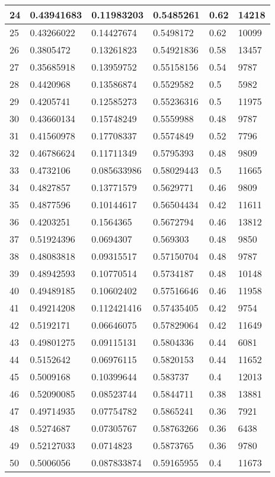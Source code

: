 \begin{longtable}{|l|l|l|l|l|l|}
24 & 0.43941683 & 0.11983203 & 0.5485261 & 0.62 & 14218 \\ \hline 
25 & 0.43266022 & 0.14427674 & 0.5498172 & 0.62 & 10099 \\ \hline 
26 & 0.3805472 & 0.13261823 & 0.54921836 & 0.58 & 13457 \\ \hline 
27 & 0.35685918 & 0.13959752 & 0.55158156 & 0.54 & 9787 \\ \hline 
28 & 0.4420968 & 0.13586874 & 0.5529582 & 0.5 & 5982 \\ \hline 
29 & 0.4205741 & 0.12585273 & 0.55236316 & 0.5 & 11975 \\ \hline 
30 & 0.43660134 & 0.15748249 & 0.5559988 & 0.48 & 9787 \\ \hline 
31 & 0.41560978 & 0.17708337 & 0.5574849 & 0.52 & 7796 \\ \hline 
32 & 0.46786624 & 0.11711349 & 0.5795393 & 0.48 & 9809 \\ \hline 
33 & 0.4732106 & 0.085633986 & 0.58029443 & 0.5 & 11665 \\ \hline 
34 & 0.4827857 & 0.13771579 & 0.5629771 & 0.46 & 9809 \\ \hline 
35 & 0.4877596 & 0.10144617 & 0.56504434 & 0.42 & 11611 \\ \hline 
36 & 0.4203251 & 0.1564365 & 0.5672794 & 0.46 & 13812 \\ \hline 
37 & 0.51924396 & 0.0694307 & 0.569303 & 0.48 & 9850 \\ \hline 
38 & 0.48083818 & 0.09315517 & 0.57150704 & 0.48 & 9787 \\ \hline 
39 & 0.48942593 & 0.10770514 & 0.5734187 & 0.48 & 10148 \\ \hline 
40 & 0.49489185 & 0.10602402 & 0.57516646 & 0.46 & 11958 \\ \hline 
41 & 0.49214208 & 0.112421416 & 0.57435405 & 0.42 & 9754 \\ \hline 
42 & 0.5192171 & 0.06646075 & 0.57829064 & 0.42 & 11649 \\ \hline 
43 & 0.49801275 & 0.09115131 & 0.5804336 & 0.44 & 6081 \\ \hline 
44 & 0.5152642 & 0.06976115 & 0.5820153 & 0.44 & 11652 \\ \hline 
45 & 0.5009168 & 0.10399644 & 0.583737 & 0.4 & 12013 \\ \hline 
46 & 0.52090085 & 0.08523744 & 0.5844711 & 0.38 & 13881 \\ \hline 
47 & 0.49714935 & 0.07754782 & 0.5865241 & 0.36 & 7921 \\ \hline 
48 & 0.5274687 & 0.07305767 & 0.58763266 & 0.36 & 6438 \\ \hline 
49 & 0.52127033 & 0.0714823 & 0.5873765 & 0.36 & 9780 \\ \hline 
50 & 0.5006056 & 0.087833874 & 0.59165955 & 0.4 & 11673 \\ \hline 
\end{longtable}